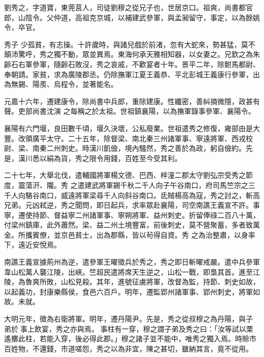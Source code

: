 
\begin{pinyinscope}

 劉秀之，字道寶，東莞莒人，司徒劉穆之從兄子也，世居京口。祖爽，尚書都官郎，山陰令。父仲道，高祖克京城，以補建武參軍，與孟昶留守，事定，以為餘姚令，卒官。



 秀子
 少孤貧，有志操。十許歲時，與諸兒戲於前渚，忽有大蛇來，勢甚猛，莫不顛沛驚呼，秀之獨不動，眾並異焉。東海何承天雅相知器，以女妻之。兄欽之為朱齡石右軍參軍，隨齡石敗沒，秀之哀戚，不歡宴者十年。景平二年，除駙馬都尉、奉朝請。家貧，求為廣陵郡丞。仍除撫軍江夏王義恭、平北彭城王義康行參軍，出為無錫、陽羨、烏程令，並著能名。



 元嘉十六年，遷建康令，除尚書中兵郎，重除建康。性纖密，善糾摘微隱，政甚有聲。吏部尚書沈演
 之每稱之於太祖。世祖鎮襄陽，以為撫軍錄事參軍、襄陽令。



 襄陽有六門堰，良田數千頃，堰久決壞，公私廢業。世祖遣秀之修復，雍部由是大豐。改領廣平太守。二十五年，除督梁、南北秦三州諸軍事、寧遠將軍、西戎校尉、梁、南秦二州刺史。時漢川飢儉，境內騷然，秀之善於為政，躬自儉約。先是，漢川悉以絹為貨，秀之限令用錢，百姓至今受其利。



 二十七年，大舉北伐，遣輔國將軍楊文德、巴西、梓潼二郡太守劉弘宗受秀之節度，震蕩汧、隴。秀
 之遣建武將軍錫千秋二千人向子午谷南口，府司馬竺宗之三千人向駱谷南口，威遠將軍梁尋千人向斜谷南口。氐賊楊高為寇，秀之討之，斬高兄弟。元凶弒逆，秀之聞問，即日起兵，求率眾赴襄陽，司空南譙王義宣不許。事寧，遷使持節、督益寧二州諸軍事、寧朔將軍、益州刺史。折留俸祿二百八十萬，付梁州鎮庫，此外蕭然。梁、益二州土境豐富，前後刺史，莫不營聚蓄，多者致萬金。所攜賓僚，並京邑貧士，出為郡縣，皆以茍得自資。秀
 之為治整肅，以身率下，遠近安悅焉。



 南譙王義宣據荊州為逆，遣參軍王曜徵兵於秀之，秀之即日斬曜戒嚴。遣中兵參軍韋山松萬人襲江陵，出峽。竺超民遣將席天生逆之，山松一戰，即梟其首。進至江陵，為魯爽所敗，山松見殺。其年，進號征虜將軍，改督為監，持節、刺史如故，以起義功，封康樂縣侯，食邑六百戶。明年，遷監郢州諸軍事、郢州刺史，將軍如故。未就。



 大明元年，徵為右衛將軍。明年，遷丹陽尹。先是，秀之從叔穆之為丹陽，與子
 弟於事上飲宴，秀之亦與焉。事柱有一穿，穆之謂子弟及秀之曰：「汝等試以栗遙擲此柱，若能入穿，後必得此郡。」穆之諸子並不能中，唯秀之獨入焉。時賒市百姓物，不還錢，市道嗟怨，秀之以為非宜，陳之甚切，雖納其言，竟不從用。




\end{pinyinscope}
